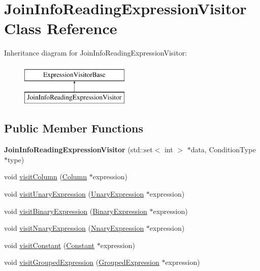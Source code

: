 \hypertarget{class_join_info_reading_expression_visitor}{\section{Join\+Info\+Reading\+Expression\+Visitor Class Reference}
\label{class_join_info_reading_expression_visitor}
}
Inheritance diagram for Join\+Info\+Reading\+Expression\+Visitor\+:\begin{figure}[H]
\begin{center}
\leavevmode
\includegraphics[height=2.000000cm]{class_join_info_reading_expression_visitor}
\end{center}
\end{figure}
\subsection*{Public Member Functions}
\begin{DoxyCompactItemize}
\item 
\hypertarget{class_join_info_reading_expression_visitor_ab9cdf35ad447efd3cfba98440d3e135a}{{\bfseries Join\+Info\+Reading\+Expression\+Visitor} (std\+::set$<$ int $>$ $\ast$data, Condition\+Type $\ast$type)}\label{class_join_info_reading_expression_visitor_ab9cdf35ad447efd3cfba98440d3e135a}

\item 
void \hyperlink{class_join_info_reading_expression_visitor_a03c3ec1bc690b6d9dc66a97efa75f2be}{visit\+Column} (\hyperlink{class_column}{Column} $\ast$expression)
\item 
void \hyperlink{class_join_info_reading_expression_visitor_a2254ead29d9226c771b530f43b677bd0}{visit\+Unary\+Expression} (\hyperlink{class_unary_expression}{Unary\+Expression} $\ast$expression)
\item 
void \hyperlink{class_join_info_reading_expression_visitor_a6c6326b1ca8218ed35ac86ab7d487a0e}{visit\+Binary\+Expression} (\hyperlink{class_binary_expression}{Binary\+Expression} $\ast$expression)
\item 
void \hyperlink{class_join_info_reading_expression_visitor_a81cdbded017bc5e294b014122b94391c}{visit\+Nnary\+Expression} (\hyperlink{class_nnary_expression}{Nnary\+Expression} $\ast$expression)
\item 
void \hyperlink{class_join_info_reading_expression_visitor_a5d94ca3c0172aeaf3436fd15f3d9ba35}{visit\+Constant} (\hyperlink{class_constant}{Constant} $\ast$expression)
\item 
void \hyperlink{class_join_info_reading_expression_visitor_af727a4e4a952f05080c8659ce0cff208}{visit\+Grouped\+Expression} (\hyperlink{class_grouped_expression}{Grouped\+Expression} $\ast$expression)
\end{DoxyCompactItemize}
